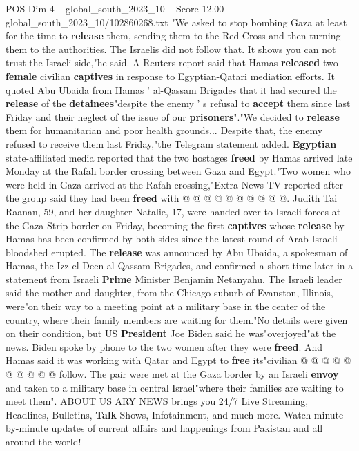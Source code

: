 \begin{textsample}{POS Dim 4 – global\_south\_2023\_10 – Score 12.00 – global\_south\_2023\_10/102860268.txt}  \label{ex:f4_pos_423}
"We asked to stop bombing Gaza at least for the time to \textbf{release} them, sending them to the Red Cross and then turning them to the authorities.
The Israelis did not follow that.
It shows you can not trust the Israeli side,"he said.
A Reuters report said that Hamas \textbf{released} two \textbf{female} civilian \textbf{captives} in response to Egyptian-Qatari mediation efforts.
It quoted Abu Ubaida from Hamas ' al-Qassam Brigades that it had secured the \textbf{release} of the \textbf{detainees}"despite the enemy ' s refusal to \textbf{accept} them since last Friday and their neglect of the issue of our \textbf{prisoners}"."We decided to \textbf{release} them for humanitarian and poor health grounds...
Despite that, the enemy refused to receive them last Friday,"the Telegram statement added. \textbf{Egyptian} state-affiliated media reported that the two hostages \textbf{freed} by Hamas arrived late Monday at the Rafah border crossing between Gaza and Egypt."Two women who were held in Gaza arrived at the Rafah crossing,"Extra News TV reported after the group said they had been \textbf{freed} with @ @ @ @ @ @ @ @ @ @.
Judith Tai Raanan, 59, and her daughter Natalie, 17, were handed over to Israeli forces at the Gaza Strip border on Friday, becoming the first \textbf{captives} whose \textbf{release} by Hamas has been confirmed by both sides since the latest round of Arab-Israeli bloodshed erupted.
The \textbf{release} was announced by Abu Ubaida, a spokesman of Hamas, the Izz el-Deen al-Qassam Brigades, and confirmed a short time later in a statement from Israeli \textbf{Prime} Minister Benjamin Netanyahu.
The Israeli leader said the mother and daughter, from the Chicago suburb of Evanston, Illinois, were"on their way to a meeting point at a military base in the center of the country, where their family members are waiting for them."No details were given on their condition, but US \textbf{President} Joe Biden said he was"overjoyed"at the news.
Biden spoke by phone to the two women after they were \textbf{freed}.
And Hamas said it was working with Qatar and Egypt to \textbf{free} its"civilian @ @ @ @ @ @ @ @ @ @ follow.
The pair were met at the Gaza border by an Israeli \textbf{envoy} and taken to a military base in central Israel"where their families are waiting to meet them".
ABOUT US ARY NEWS brings you 24/7 Live Streaming, Headlines, Bulletins, \textbf{Talk} Shows, Infotainment, and much more.
Watch minute-by-minute updates of current affairs and happenings from Pakistan and all around the world!

\end{textsample}
